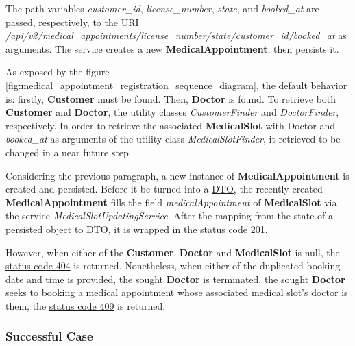 The path variables \textit{customer\_id}, \textit{license\_number}, \textit{state}, and \textit{booked\_at} are passed, respectively, to the \hyperref[appendix:glossary]{URI} \textit{/api/v2/medical\_appointments/\underline{license\_number}/\underline{state}/\underline{customer\_id}/\underline{booked\_at}} as arguments. The service creates a new \textbf{MedicalAppointment}, then persists it.

As exposed by the figure \ref{fig:medical_appointment_registration_sequence_diagram}, the default behavior is: firstly, \textbf{Customer} must be found. Then, \textbf{Doctor} is found. To retrieve both \textbf{Customer} and \textbf{Doctor}, the utility classes \textit{CustomerFinder} and \textit{DoctorFinder}, respectively. In order to retrieve the associated \textbf{MedicalSlot} with Doctor and \textit{booked\_at} as arguments of the utility class \textit{MedicalSlotFinder}, it retrieved to be changed in a near future step.

Considering the previous paragraph, a new instance of \textbf{MedicalAppointment} is created and persisted. Before it be turned into a \hyperref[appendix:glossary]{DTO}, the recently created \textbf{MedicalAppointment} fills the field \textit{medicalAppointment} of \textbf{MedicalSlot} via the service \textit{MedicalSlotUpdatingService}. 
After the mapping from the state of a persisted object to \hyperref[appendix:glossary]{DTO}, it is wrapped in the \hyperref[appendix:http_status_codes_summary_appendix]{status code 201}.

However, when either of the \textbf{Customer}, \textbf{Doctor} and \textbf{MedicalSlot} is null, the \hyperref[appendix:http_status_codes_summary_appendix]{status code 404} is returned. Nonetheless, when either of the duplicated booking date and time is provided, the sought \textbf{Doctor} is terminated, the sought \textbf{Doctor} seeks to booking a medical appointment whose associated medical slot's doctor is them, the  \hyperref[appendix:http_status_codes_summary_appendix]{status code 409} is returned.

\subsubsection{Successful Case}

